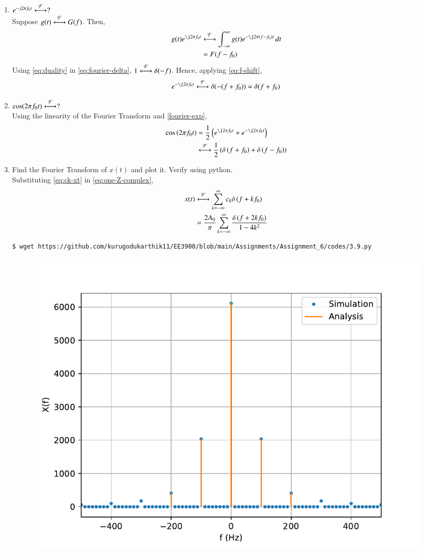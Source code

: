 \documentclass[journal,12pt,twocolumn]{IEEEtran}
\renewcommand\thesection{\arabic{section}}
\begin{document}
\begin{enumerate}[label=\thesection.\arabic*
,ref=\thesection.\theenumi]
\begin{align}
&=\int_{-\infty}^{\infty}\delta(t)\, dt = 1
\label{eq:fourier-delta}
\end{align}
\item $e^{-j2\pi f_0t}\overset{\mathcal{F}}{ \longleftrightarrow}?$ \\
\solution Suppose $g(t)\overset{\mathcal{F}}{ \longleftrightarrow}G(f)$. Then,
\begin{align}
g(t)e^{\j2\pi f_0t}&\system{F}\int_{-\infty}^{\infty}
g(t)e^{-\j2\pi\brak{f-f_0}t}\, dt \\
&=F(f-f_0)
\label{eq:f-shift}
\end{align}
Using \eqref{eq:duality} in \eqref{eq:fourier-delta}, $1\overset{\mathcal{F}}{ \longleftrightarrow}\delta(-f)$.
Hence, applying \eqref{eq:f-shift},
\begin{align}
e^{-\j2\pi f_0t}\system{F}\delta(-(f+f_0)) = \delta(f+f_0)
\label{eq:fourier-exp}
\end{align}
\item $\cos(2\pi f_0t)\overset{\mathcal{F}}{ \longleftrightarrow}?$ \\
\solution Using the linearity of the Fourier
Transform and \eqref{fourier-exp},
\begin{align}
\cos\brak{2\pi f_0t} &= \frac{1}{2}
\brak{e^{\j2\pi f_0t} + e^{-\j2\pi f_0t}} \\
&\system{F}\frac{1}{2}\brak{\delta\brak{f+f_0} + \delta\brak{f-f_0}}
\end{align}
\item Find the Fourier Transform of $x(t)$ and plot it. Verify using python. \\
\solution Substituting \eqref{eq:ck-xt} in \eqref{eq:one-Z-complex},
\begin{align}
x(t)&\overset{\mathcal{F}}{ \longleftrightarrow}\sum_{k=-\infty}^{\infty}c_k\delta\left(f+kf_0\right) \\
&=\frac{2A_0}{\pi}\sum_{k=-\infty}^{\infty}\frac{\delta\left(f+2kf_0\right)}{1-4k^2}
\label{eq:fourier-xt}
\end{align}
\begin{lstlisting}
$ wget https://github.com/kurugodukarthik11/EE3900/blob/main/Assignments/Assignment_6/codes/3.9.py
\end{lstlisting}
\begin{figure}[!ht]
\includegraphics[width=\columnwidth]{figs/3.8.pdf}

\end{figure}
\end{enumerate}
\end{document}
